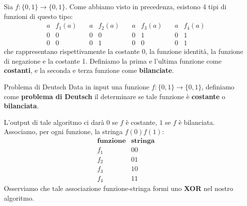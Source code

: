 Sia $f: \{0,1\} \rightarrow \{0,1\}$. Come abbiamo visto in precedenza, esistono 4 tipi di funzioni di questo tipo:
\begin{equation*}
    \begin{array}{c|c}
        a & f_1(a) \\
        \hline
        0 & 0 \\
        0 & 0
    \end{array}
    \quad
    \begin{array}{c|c}
        a & f_2(a) \\
        \hline
        0 & 0 \\
        0 & 1
    \end{array}
    \quad
    \begin{array}{c|c}
        a & f_3(a) \\
        \hline
        0 & 1 \\
        0 & 0
    \end{array}
    \quad
    \begin{array}{c|c}
        a & f_4(a) \\
        \hline
        0 & 1 \\
        0 & 1
    \end{array}
\end{equation*}
che rappresentano rispettivamente la costante 0, la funzione identità, la funzione di negazione e la costante 1.
Definiamo la prima e l'ultima funzione come \textbf{costanti}, e la seconda e terza funzione come \textbf{bilanciate}.

\begin{definition}{Problema di Deutsch}{}
    Data in input una funzione $f: \{0,1\} \rightarrow \{0,1\}$, definiamo come \textbf{problema di Deutsch} il
    determinare se tale funzione è \textbf{costante} o \textbf{bilanciata}. 
\end{definition}
L'output di tale algoritmo ci darà $0$ se $f$ è costante, $1$ se $f$ è bilanciata. Associamo, per ogni funzione, la stringa
$f(0)f(1)$:
\begin{equation*}
    \begin{array}{c|c}
        \textbf{funzione} & \textbf{stringa} \\
        \hline
        f_1 & 00 \\
        f_2 & 01 \\
        f_3 & 10 \\
        f_4 & 11 
    \end{array}
\end{equation*}
Osserviamo che tale associazione funzione-stringa formi uno \textbf{XOR} nel nostro algoritmo.


